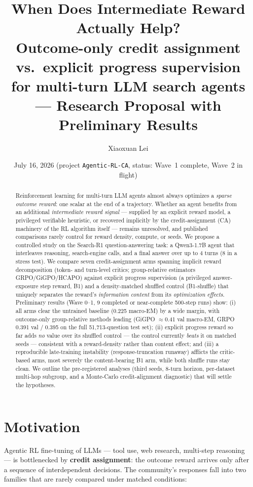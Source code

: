 \documentclass[11pt,a4paper]{article}
\title{\bfseries When Does Intermediate Reward Actually Help?\\
\large Outcome-only credit assignment vs.\ explicit progress supervision\\
for multi-turn LLM search agents --- Research Proposal with Preliminary Results}
\author{Xiaoxuan Lei}
\date{July 16, 2026 \quad (project \texttt{Agentic-RL-CA}, status: Wave~1 complete, Wave~2 in flight)}
\begin{document}
\maketitle

\begin{abstract}
Reinforcement learning for multi-turn LLM agents almost always optimizes a \emph{sparse outcome
reward}: one scalar at the end of a trajectory. Whether an agent benefits from an additional
\emph{intermediate reward signal} --- supplied by an explicit reward model, a privileged
verifiable heuristic, or recovered implicitly by the credit-assignment (CA) machinery of the RL
algorithm itself --- remains unresolved, and published comparisons rarely control for reward
density, compute, or seeds. We propose a controlled study on the Search-R1 question-answering
task: a Qwen3-1.7B agent that interleaves reasoning, search-engine calls, and a final answer over
up to 4 turns (8 in a stress test). We compare seven credit-assignment arms spanning implicit
reward decomposition (token- and turn-level critics; group-relative estimators GRPO/GiGPO/HCAPO)
against explicit progress supervision (a privileged answer-exposure step reward, B1) and a
density-matched shuffled control (B1-shuffle) that uniquely separates the reward's
\emph{information content} from its \emph{optimization effects}. Preliminary results (Wave 0--1,
9 completed or near-complete 500-step runs) show: (i) all arms clear the untrained baseline
(0.225 macro-EM) by a wide margin, with outcome-only group-relative methods leading (GiGPO
$\approx$0.41 val macro-EM, GRPO 0.391 val / 0.395 on the full 51{,}713-question test set);
(ii) explicit progress reward so far adds \emph{no} value over its shuffled control --- the
control currently \emph{beats} it on matched seeds --- consistent with a reward-density rather
than content effect; and (iii) a reproducible late-training instability (response-truncation
runaway) afflicts the critic-based arms, most severely the content-bearing B1 arm, while both
shuffle runs stay clean. We outline the pre-registered analyses (third seeds, 8-turn horizon,
per-dataset multi-hop subgroup, and a Monte-Carlo credit-alignment diagnostic) that will settle
the hypotheses.
\end{abstract}

\section{Motivation}

Agentic RL fine-tuning of LLMs --- tool use, web research, multi-step reasoning --- is
bottlenecked by \textbf{credit assignment}: the outcome reward arrives only after a sequence of
interdependent decisions. The community's responses fall into two families that are rarely
compared under matched conditions:
\end{document}

